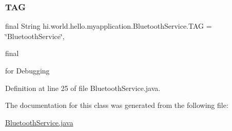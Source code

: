 \subsubsection{\texorpdfstring{TAG}{TAG}}
{\footnotesize\ttfamily final String hi.\+world.\+hello.\+myapplication.\+Bluetooth\+Service.\+T\+AG = \char`\"{}Bluetooth\+Service\char`\"{}\hspace{0.3cm}{\ttfamily [static]}, {\ttfamily [private]}}



final 

for Debugging 

Definition at line 25 of file Bluetooth\+Service.\+java.



The documentation for this class was generated from the following file\+:\begin{DoxyCompactItemize}
\item 
\mbox{\hyperlink{_bluetooth_service_8java}{Bluetooth\+Service.\+java}}\end{DoxyCompactItemize}
